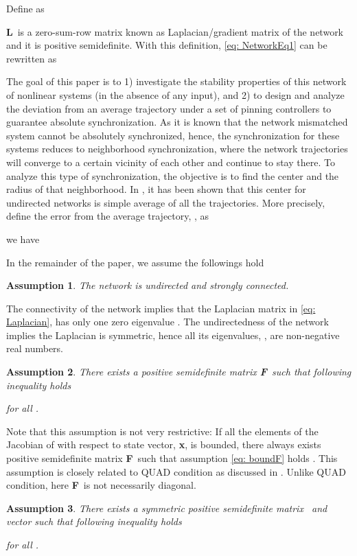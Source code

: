 \documentclass[conference]{IEEEtran}
\newtheorem{ass}{Assumption}
\def\bGamma{\mbox{}}
\def\bx{\mbox{{\bf x}}}
\def\bF{\mbox{{\bf F}}}
\def\bL{\mbox{{\bf L}}}
\begin{document}
		
Define  as
	
	\bL~is a zero-sum-row matrix known as Laplacian/gradient matrix of the network and it is positive semidefinite. With this definition, \eqref{eq: NetworkEq1} can be rewritten as
	
	The goal of this paper is to 1) investigate the stability properties of this network of nonlinear systems (in the absence of any input), and 2) to design and analyze the deviation from an average trajectory under a set of pinning controllers to guarantee absolute synchronization. 
	As it is known that the network mismatched system cannot be absolutely synchronized, hence, the synchronization for these systems reduces to neighborhood synchronization, where the network trajectories will converge to a certain vicinity of each other and continue to stay there\cite{Sun09, Sorrentino11, Acharyya12,Manaffam15}. To analyze this type of synchronization, the objective is to find the center and the radius of that neighborhood. In \cite{Manaffam15}, it has been shown that this center for undirected networks is simple average of all the trajectories. More precisely, define the error from the average trajectory, , as 

		
		we have
		

In the remainder of the paper, we assume the followings hold
	\begin{ass}\label{Assumption: Connected}
	The network is undirected and strongly connected.
	\end{ass}
	The connectivity of the network implies that the Laplacian matrix in \eqref{eq: Laplacian}, has only one zero eigenvalue \cite{Mohar91}. The undirectedness of the network implies the Laplacian is symmetric, hence all its eigenvalues, , are non-negative real numbers.
	\begin{ass}\label{Assumption: BoundF}
		There exists a positive semidefinite matrix \bF~such that following inequality holds 
			
			for all .
	\end{ass}	
	Note that this assumption is not very restrictive: If all the elements of the Jacobian of  with respect to state vector, \bx, is bounded, there always exists positive semidefinite matrix \bF~such that assumption \eqref{eq: boundF} holds \cite{Yu09}. This assumption is closely related to QUAD condition as discussed in \cite{DeLilles11}. Unlike QUAD condition, here \bF~is not necessarily diagonal.		

	\begin{ass}\label{Assumption: Bounded mismatch}
		There exists a symmetric positive semidefinite matrix \bGamma~and vector  such that following inequality holds 
			
			for all .
	\end{ass}	
	
\end{document}
